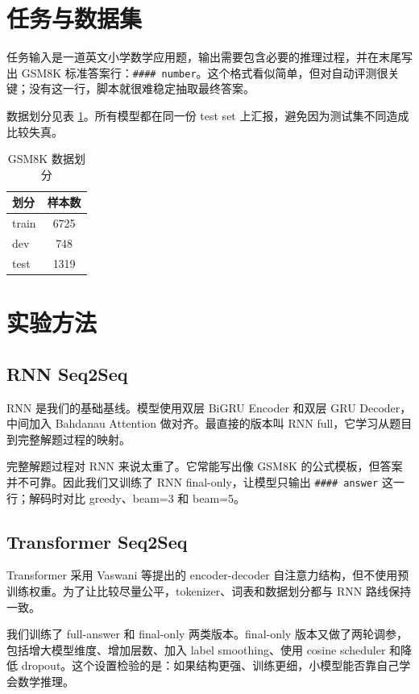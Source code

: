 \documentclass[UTF8,a4paper,zihao=-4]{ctexart}
\begin{document}
\section{任务与数据集}

任务输入是一道英文小学数学应用题，输出需要包含必要的推理过程，并在末尾写出 GSM8K 标准答案行：\texttt{\#\#\#\# number}。这个格式看似简单，但对自动评测很关键；没有这一行，脚本就很难稳定抽取最终答案。

数据划分见表 \ref{tab:data}。所有模型都在同一份 test set 上汇报，避免因为测试集不同造成比较失真。

\begin{table}[H]
\centering
\caption{GSM8K 数据划分}
\label{tab:data}
\begin{tabular}{lc}
\toprule
划分 & 样本数 \\
\midrule
train & 6725 \\
dev & 748 \\
test & 1319 \\
\bottomrule
\end{tabular}
\end{table}

\section{实验方法}

\subsection{RNN Seq2Seq}

RNN 是我们的基础基线。模型使用双层 BiGRU Encoder 和双层 GRU Decoder，中间加入 Bahdanau Attention 做对齐。最直接的版本叫 RNN full，它学习从题目到完整解题过程的映射。

完整解题过程对 RNN 来说太重了。它常能写出像 GSM8K 的公式模板，但答案并不可靠。因此我们又训练了 RNN final-only，让模型只输出 \texttt{\#\#\#\# answer} 这一行；解码时对比 greedy、beam=3 和 beam=5。

\subsection{Transformer Seq2Seq}

Transformer 采用 Vaswani 等提出的 encoder-decoder 自注意力结构\cite{vaswani2017attention}，但不使用预训练权重。为了让比较尽量公平，tokenizer、词表和数据划分都与 RNN 路线保持一致。

我们训练了 full-answer 和 final-only 两类版本。final-only 版本又做了两轮调参，包括增大模型维度、增加层数、加入 label smoothing、使用 cosine scheduler 和降低 dropout。这个设置检验的是：如果结构更强、训练更细，小模型能否靠自己学会数学推理。
\end{document}
